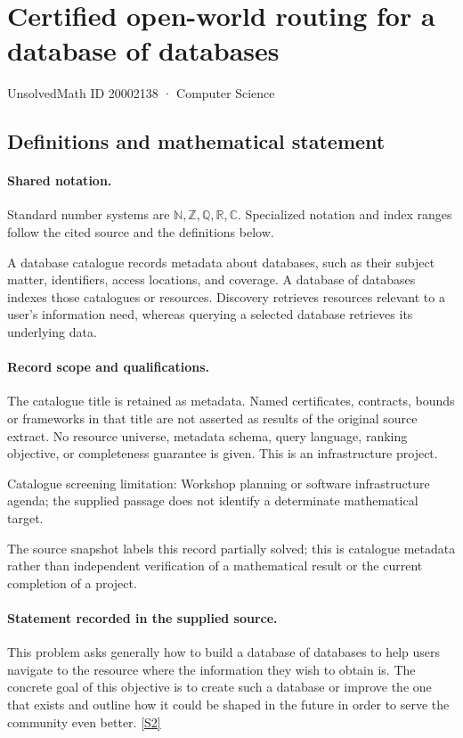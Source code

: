 \documentclass[11pt]{article}
\newcommand{\sref}[2]{\hyperlink{source:#1:#2}{[S#2]}}
\begin{document}
\setcounter{section}{20002137}
\section{Certified open-world routing for a database of databases}\label{20002138}
{\small\sffamily UnsolvedMath ID 20002138 · Computer Science}
\subsection{Definitions and mathematical statement}

\paragraph{Shared notation.}Standard number systems are $\mathbb N,\mathbb Z,\mathbb Q,\mathbb R,\mathbb C$. Specialized notation and index ranges follow the cited source and the definitions below.


A database catalogue records metadata about databases, such as their subject matter, identifiers, access locations, and coverage. A database of databases indexes those catalogues or resources. Discovery retrieves resources relevant to a user's information need, whereas querying a selected database retrieves its underlying data.
\paragraph{Record scope and qualifications.}
The catalogue title is retained as metadata. Named certificates, contracts, bounds or frameworks in that title are not asserted as results of the original source extract.
No resource universe, metadata schema, query language, ranking objective, or completeness guarantee is given. This is an infrastructure project.

Catalogue screening limitation: Workshop planning or software infrastructure agenda; the supplied passage does not identify a determinate mathematical target.

The source snapshot labels this record partially solved; this is catalogue metadata rather than independent verification of a mathematical result or the current completion of a project.
\paragraph{Statement recorded in the supplied source.}
This problem asks generally how to build a database of databases to help users navigate to the resource where the information they wish to obtain is.
The concrete goal of this objective is to create such a database or improve the one that exists and outline how it could be shaped in the future in order to serve the community even better. \sref{20002138}{2}
\end{document}
